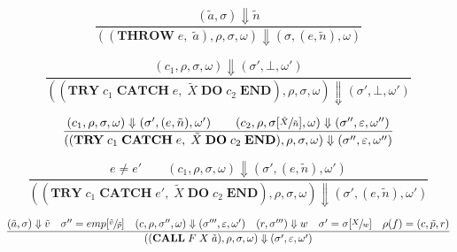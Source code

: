 \begin{equation}
\frac{(\tilde{a}, \sigma) \Downarrow \tilde{n}}{((\textbf{THROW}\; e,\; \tilde{a}), \rho, \sigma, \omega) \Downarrow (\sigma, (e, \tilde{n}), \omega)}
\end{equation}

\begin{equation}
\frac{(c_1, \rho, \sigma, \omega) \Downarrow (\sigma', \bot, \omega')}{((\textbf{TRY}\; c_1\; \textbf{CATCH}\; e,\; \tilde{X}\; \textbf{DO}\; c_2\; \textbf{END}), \rho, \sigma, \omega) \Downarrow (\sigma', \bot, \omega')}
\end{equation}

\begin{equation}
\frac{(c_1, \rho, \sigma, \omega) \Downarrow (\sigma', (e, \tilde{n}), \omega') \qquad (c_2, \rho, \sigma[\sfrac{\tilde{X}}{\tilde{n}}], \omega) \Downarrow (\sigma'', \varepsilon, \omega'')}{((\textbf{TRY}\; c_1\; \textbf{CATCH}\; e,\; \tilde{X}\; \textbf{DO}\; c_2\; \textbf{END}), \rho, \sigma, \omega) \Downarrow (\sigma'', \varepsilon, \omega'')}
\end{equation}

\begin{equation}
\frac{e \neq e' \qquad (c_1, \rho, \sigma, \omega) \Downarrow (\sigma', (e, \tilde{n}), \omega')}{((\textbf{TRY}\; c_1\; \textbf{CATCH}\; e',\; \tilde{X}\; \textbf{DO}\; c_2\; \textbf{END}), \rho, \sigma, \omega) \Downarrow (\sigma', (e, \tilde{n}), \omega')}
\end{equation}

\begin{equation}
\frac
{(\tilde{a},\sigma) \Downarrow \tilde{v} \quad \sigma''= emp[\sfrac{\tilde{v}}{\tilde{p}}] \quad (c, \rho, \sigma'', \omega) \Downarrow (\sigma''', \varepsilon, \omega') \quad (r,\sigma''') \Downarrow w \quad \sigma' = \sigma[\sfrac{X}{w}] \quad \rho(f) = (c, \tilde{p}, r)}
{((\textbf{CALL}\; F \; X  \; \tilde{a}), \rho, \sigma, \omega) \Downarrow (\sigma', \varepsilon, \omega')}
\end{equation}